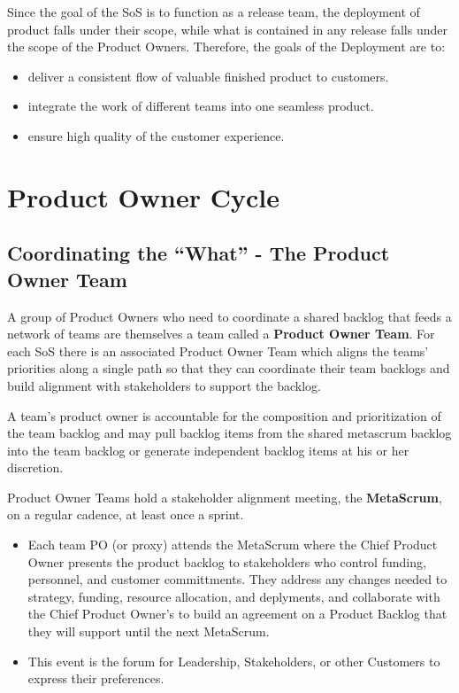 \documentclass[12pt,a4paper,parskip=full]{scrartcl}
\begin{document}
Since the goal of the SoS is to function as a release team, the deployment
of product falls under their scope, while what is contained in any release
falls under the scope of the Product Owners. Therefore, the goals of the
Deployment are to:
\begin{itemize}
\item deliver a consistent flow of valuable finished product to customers.
\item integrate the work of different teams into one seamless product.
\item ensure high quality of the customer experience.
\end{itemize}

\section{Product Owner Cycle}
\subsection{Coordinating the ``What'' - The Product Owner Team}
A group of Product Owners who need to coordinate a shared backlog that
feeds a network of teams are themselves a team called a \textbf{Product Owner Team}.
For each SoS there is an associated Product Owner Team which aligns the
teams' priorities along a single path so that they can coordinate their
team backlogs and build alignment with stakeholders to support the backlog.

A team's product owner is accountable for the composition and prioritization
of the team backlog and may pull backlog items from the shared metascrum backlog
into the team backlog or generate independent backlog items at his or her discretion.

Product Owner Teams hold a stakeholder alignment meeting, the \textbf{MetaScrum}, on a regular cadence, at least once a sprint. 
\begin{itemize}
\item Each team PO (or proxy) attends the MetaScrum where the Chief Product Owner presents the product backlog to stakeholders who control funding, personnel, and customer committments. They address any changes needed to strategy, funding, resource allocation, and deplyments, and collaborate with the Chief Product Owner's to build an agreement on a Product Backlog that they will support until the next MetaScrum.
\item This event is the forum for Leadership, Stakeholders, or other
Customers to express their preferences.
\end{itemize}
\end{document}
